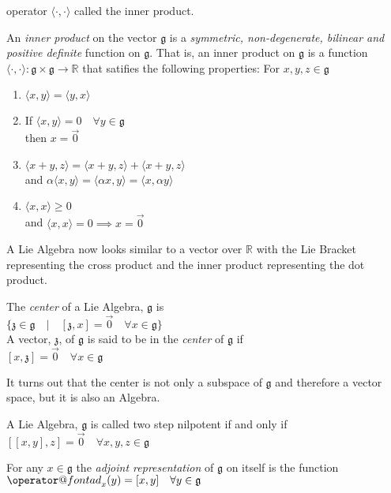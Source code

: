 \documentclass[11 pt]{article}
\makeatletter
\renewcommand{\a}{\alpha}
\newcommand{\fg}{\mathfrak{g}}
\newcommand{\fz}{\mathfrak{z}}
\newcommand{\RR}{\mathbb{R}}
\newcommand{\ad}[1]{\mathop{\operator@font ad}\nolimits_{#1}}
\makeatother
\begin{document}
    operator $\langle\cdot,\cdot\rangle$ called the inner product.
\begin{definition}
    An \emph{inner product} on the vector $\fg$ is a \emph{symmetric, non-degenerate, bilinear and positive definite}
    function on $\fg$.  That is, an inner product on $\fg$ is a function $\langle\cdot,\cdot\rangle:\fg\times\fg\to\RR$
    that satifies the following properties:
    For $x,y,z \in \fg$
    \begin{enumerate}
        \item $\langle x,y \rangle = \langle y,x \rangle$
        \item If $\langle x,y \rangle = 0 \quad \forall y \in \fg$ 
            \\then $x = \Vec{0}$
        \item $\langle x+y,z \rangle = \langle x+y,z \rangle + \langle x+y,z \rangle$
        \\and $\a \langle x,y \rangle = \langle \a x,y \rangle = \langle x,\a y \rangle$
        \item $\langle x,x \rangle \geq 0$ 
            \\and $\langle x,x\rangle = 0 \implies x=\Vec{0}$
    \end{enumerate}
\end{definition}
    A Lie Algebra now looks similar to a vector over $\RR$ with the Lie Bracket representing
    the cross product and the inner product representing the dot product.

\begin{definition}
    The \emph{center} of a Lie Algebra, $\fg$ is
    \\$\{\fz \in \fg \quad | \quad [\fz,x] = \Vec{0} \quad \forall x \in \fg\}$
    \\A vector, $\fz$, of $\fg$ is said to be in the \emph{center} of $\fg$ if
    \\$[x,\fz] = \Vec{0} \quad \forall x \in \fg$
\end{definition}
It turns out that the center is not only a subspace of $\fg$ and therefore a vector space,
but it is also an Algebra.

\begin{definition}
    A Lie Algebra, $\fg$ is called two step nilpotent if and only if
    \\$[[x,y],z] = \Vec{0} \quad \forall x,y,z \in \fg$
\end{definition}

\begin{definition}
    For any $x \in \fg$ the \emph{adjoint representation} of $\fg$ on itself is the function
    \\$\ad{x}(y) = [x,y] \quad \forall y \in \fg$
\end{definition}
\end{document}
